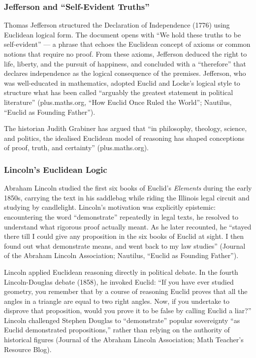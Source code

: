 \documentclass[11pt,letterpaper]{article}
\begin{document}
\subsubsection{Jefferson and ``Self-Evident Truths''}

Thomas Jefferson structured the Declaration of Independence (1776) using Euclidean logical form. The document opens with ``We hold these truths to be self-evident'' --- a phrase that echoes the Euclidean concept of axioms or common notions that require no proof. From these axioms, Jefferson deduced the right to life, liberty, and the pursuit of happiness, and concluded with a ``therefore'' that declares independence as the logical consequence of the premises. Jefferson, who was well-educated in mathematics, adopted Euclid and Locke's logical style to structure what has been called ``arguably the greatest statement in political literature'' (plus.maths.org, ``How Euclid Once Ruled the World''; Nautilus, ``Euclid as Founding Father'').

The historian Judith Grabiner has argued that ``in philosophy, theology, science, and politics, the idealised Euclidean model of reasoning has shaped conceptions of proof, truth, and certainty'' (plus.maths.org).

\subsubsection{Lincoln's Euclidean Logic}

Abraham Lincoln studied the first six books of Euclid's \textit{Elements} during the early 1850s, carrying the text in his saddlebag while riding the Illinois legal circuit and studying by candlelight. Lincoln's motivation was explicitly epistemic: encountering the word ``demonstrate'' repeatedly in legal texts, he resolved to understand what rigorous proof actually meant. As he later recounted, he ``stayed there till I could give any proposition in the six books of Euclid at sight. I then found out what demonstrate means, and went back to my law studies'' (Journal of the Abraham Lincoln Association; Nautilus, ``Euclid as Founding Father'').

Lincoln applied Euclidean reasoning directly in political debate. In the fourth Lincoln-Douglas debate (1858), he invoked Euclid: ``If you have ever studied geometry, you remember that by a course of reasoning Euclid proves that all the angles in a triangle are equal to two right angles. Now, if you undertake to disprove that proposition, would you prove it to be false by calling Euclid a liar?'' Lincoln challenged Stephen Douglas to ``demonstrate'' popular sovereignty ``as Euclid demonstrated propositions,'' rather than relying on the authority of historical figures (Journal of the Abraham Lincoln Association; Math Teacher's Resource Blog).
\end{document}
